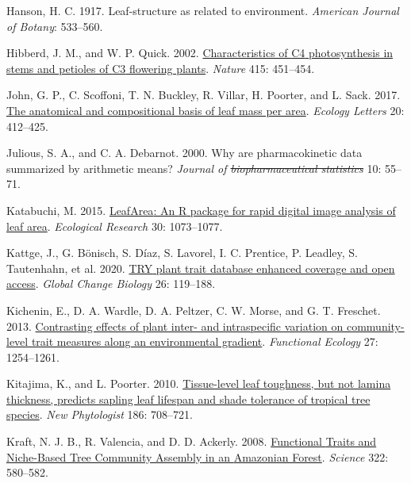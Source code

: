 \documentclass[
  12pt,
  a4paper,
,tablecaptionabove
]{scrartcl}
\newlength{\cslhangindent}
\newenvironment{CSLReferences}[2] %
 {%
  \setlength{\parindent}{0pt}
  \ifodd #1 \everypar{\setlength{\hangindent}{\cslhangindent}}\ignorespaces\fi
  \ifnum #2 > 0
  \setlength{\parskip}{#2\baselineskip}
  \fi
 }%
 {}
\providecommand{\DIFaddtex}[1]{{\protect\color{blue}\uwave{#1}}} %
\providecommand{\DIFdeltex}[1]{{\protect\color{red}\sout{#1}}}                      %
\providecommand{\DIFaddbegin}{} %
\providecommand{\DIFaddend}{} %
\providecommand{\DIFdelbegin}{} %
\providecommand{\DIFdelend}{} %
\providecommand{\DIFadd}[1]{\texorpdfstring{\DIFaddtex{#1}}{#1}} %
\providecommand{\DIFdel}[1]{\texorpdfstring{\DIFdeltex{#1}}{}} %
\newcommand{\DIFscaledelfig}{0.5}
\newlength{\DIFdelgraphicswidth} %
\newlength{\DIFdelgraphicsheight} %
\newcommand{\DIFaddincludegraphics}[2][]{{\color{blue}\fbox{\DIFOincludegraphics[#1]{#2}}}} %
\newcommand{\DIFdelincludegraphics}[2][]{%
\sbox{\DIFdelgraphicsbox}{\DIFOincludegraphics[#1]{#2}}%
\settoboxwidth{\DIFdelgraphicswidth}{\DIFdelgraphicsbox} %
\settoboxtotalheight{\DIFdelgraphicsheight}{\DIFdelgraphicsbox} %
\scalebox{\DIFscaledelfig}{%
\parbox[b]{\DIFdelgraphicswidth}{\usebox{\DIFdelgraphicsbox}\\[-\baselineskip] \rule{\DIFdelgraphicswidth}{0em}}\llap{\resizebox{\DIFdelgraphicswidth}{\DIFdelgraphicsheight}{%
\setlength{\unitlength}{\DIFdelgraphicswidth}%
\begin{picture}(1,1)%
\thicklines\linethickness{2pt} %
{\color[rgb]{1,0,0}\put(0,0){\framebox(1,1){}}}%
{\color[rgb]{1,0,0}\put(0,0){\line( 1,1){1}}}%
{\color[rgb]{1,0,0}\put(0,1){\line(1,-1){1}}}%
\end{picture}%
}\hspace*{3pt}}} %
} %
\DeclareRobustCommand{\DIFaddbegin}{\DIFOaddbegin \let\includegraphics\DIFaddincludegraphics} %
\DeclareRobustCommand{\DIFaddend}{\DIFOaddend \let\includegraphics\DIFOincludegraphics} %
\DeclareRobustCommand{\DIFdelbegin}{\DIFOdelbegin \let\includegraphics\DIFdelincludegraphics} %
\DeclareRobustCommand{\DIFdelend}{\DIFOaddend \let\includegraphics\DIFOincludegraphics} %
\begin{document}
\begin{CSLReferences}{1}{0}
\leavevmode{}%
Hanson, H. C. 1917. Leaf-structure as related to environment.
\emph{American Journal of Botany}: 533--560.

\leavevmode{}%
Hibberd, J. M., and W. P. Quick. 2002.
\href{https://doi.org/10.1038/415451a}{Characteristics of {C4}
photosynthesis in stems and petioles of {C3} flowering plants}.
\emph{Nature} 415: 451--454.

\leavevmode{}%
John, G. P., C. Scoffoni, T. N. Buckley, R. Villar, H. Poorter, and L.
Sack. 2017. \href{https://doi.org/10.1111/ele.12739}{The anatomical and
compositional basis of leaf mass per area}. \emph{Ecology Letters} 20:
412--425.

\leavevmode{}%
Julious, S. A., and C. A. Debarnot. 2000. Why are pharmacokinetic data
summarized by arithmetic means? \emph{Journal of \DIFdelbegin \DIFdel{biopharmaceutical
statistics}\DIFdelend \DIFaddbegin \DIFadd{Biopharmaceutical
Statistics}\DIFaddend } 10: 55--71.

\leavevmode{}%
Katabuchi, M. 2015.
\href{https://doi.org/10.1007/s11284-015-1307-x}{{LeafArea}: An {R}
package for rapid digital image analysis of leaf area}. \emph{Ecological
Research} 30: 1073--1077.

\leavevmode{}%
Kattge, J., G. Bönisch, S. Díaz, S. Lavorel, I. C. Prentice, P. Leadley,
S. Tautenhahn, et al. 2020.
\href{https://doi.org/10.1111/gcb.14904}{{TRY} plant trait database
\textendash{} enhanced coverage and open access}. \emph{Global Change
Biology} 26: 119--188.

\leavevmode{}%
Kichenin, E., D. A. Wardle, D. A. Peltzer, C. W. Morse, and G. T.
Freschet. 2013.
\href{https://doi.org/10.1111/1365-2435.12116}{Contrasting effects of
plant inter- and intraspecific variation on community-level trait
measures along an environmental gradient}. \emph{Functional Ecology} 27:
1254--1261.

\leavevmode{}%
Kitajima, K., and L. Poorter. 2010.
\href{https://doi.org/10.1111/j.1469-8137.2010.03212.x}{Tissue-level
leaf toughness, but not lamina thickness, predicts sapling leaf lifespan
and shade tolerance of tropical tree species}. \emph{New Phytologist}
186: 708--721.

\leavevmode{}%
Kraft, N. J. B., R. Valencia, and D. D. Ackerly. 2008.
\href{https://doi.org/10.1126/science.1160662}{Functional {Traits} and
{Niche-Based Tree Community Assembly} in an {Amazonian Forest}}.
\emph{Science} 322: 580--582.


\end{CSLReferences}
\end{document}
